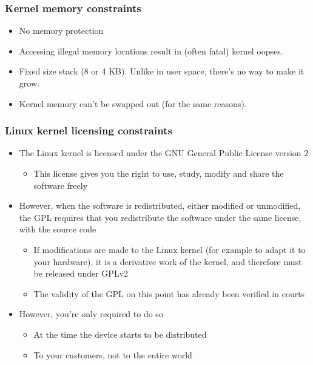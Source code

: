 \begin{frame}
  \frametitle{Kernel memory constraints}
  \begin{itemize}
  \item No memory protection
  \item Accessing illegal memory locations result in (often fatal)
    kernel oopses.
  \item Fixed size stack (8 or 4 KB). Unlike in user space, there's no
    way to make it grow.
  \item Kernel memory can't be swapped out (for the same reasons).
  \end{itemize}
\end{frame}

\begin{frame}
  \frametitle{Linux kernel licensing constraints}
  \begin{itemize}
  \item The Linux kernel is licensed under the GNU General Public
    License version 2
    \begin{itemize}
    \item This license gives you the right to use, study, modify and
      share the software freely
    \end{itemize}
  \item However, when the software is redistributed, either modified
    or unmodified, the GPL requires that you redistribute the software
    under the same license, with the source code
    \begin{itemize}
    \item If modifications are made to the Linux kernel (for example
      to adapt it to your hardware), it is a derivative work of the
      kernel, and therefore must be released under GPLv2
    \item The validity of the GPL on this point has already been
      verified in courts
    \end{itemize}
  \item However, you're only required to do so
    \begin{itemize}
    \item At the time the device starts to be distributed
    \item To your customers, not to the entire world
    \end{itemize}
  \end{itemize}
\end{frame}

